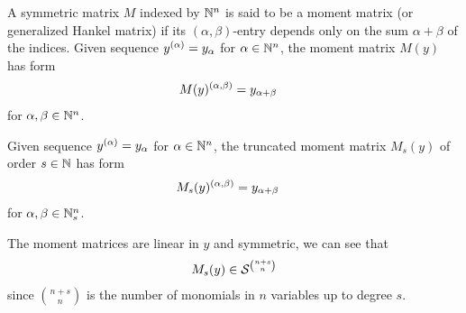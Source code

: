 \begin{definition}
  A symmetric matrix $M$ indexed by $\mathbb{N}^n$ is said to be a moment matrix (or generalized Hankel matrix) if its $(\alpha, \beta)$-entry depends only on the sum $\alpha + \beta$ of the indices.
  Given sequence $y^{(\alpha)} = y_\alpha$ for $\alpha\in\mathbb{N}^n$, the moment matrix $M(y)$ has form
  \begin{align}
    M(y)^{(\alpha, \beta)} &= y_{\alpha + \beta}
  \end{align}
  for $\alpha, \beta \in\mathbb{N}^n$.
\end{definition}

\begin{definition}
  Given sequence $y^{(\alpha)} = y_\alpha$ for $\alpha\in\mathbb{N}^n$, the truncated moment matrix $M_s(y)$ of order $s\in\mathbb{N}$ has form
  \begin{align}
    M_s(y)^{(\alpha, \beta)} &= y_{\alpha + \beta}
  \end{align}
  for $\alpha, \beta \in\mathbb{N}_s^n$.
\end{definition}

The moment matrices are linear in $y$ and symmetric, we can see that
\begin{align}
  M_s(y)\in\mathcal{S}^{\binom{n+s}{n}}
\end{align}
since $\binom{n+s}{n}$ is the number of monomials in $n$ variables up to degree $s$.

